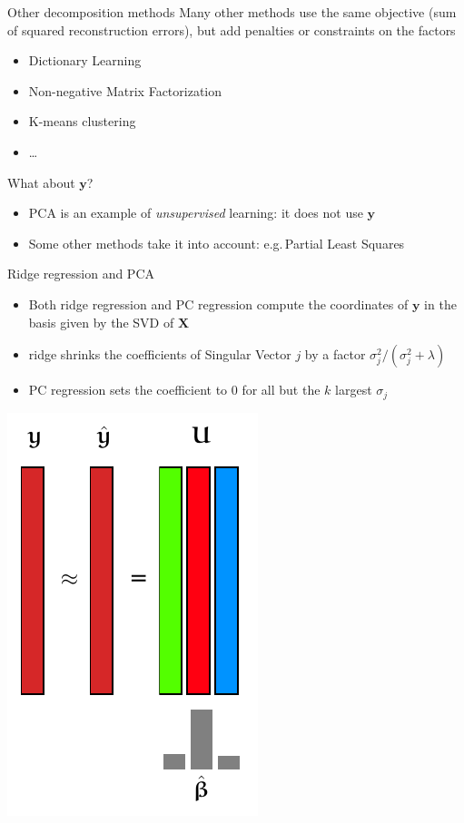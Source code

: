 \documentclass[presentation,mathserif,table]{beamer}
\newcommand{\eg}{e.g.\,}
\newcommand{\X}{{\mathbold X}}
\newcommand{\y}{{\mathbold y}}
\begin{document}
\begin{frame}[label={sec:orge968557}]{Other decomposition methods}
Many other methods use the same objective (sum of squared reconstruction errors), but add penalties or constraints on the factors
\begin{itemize}
\item Dictionary Learning
\item Non-negative Matrix Factorization
\item K-means clustering
\item \ldots{}
\end{itemize}

\begin{block}{What about \(\y\)?}
\begin{itemize}
\item PCA is an example of \emph{unsupervised} learning: it does not use \(\y\)
\item Some other methods take it into account: \eg Partial Least Squares
\end{itemize}
\end{block}
\end{frame}
\begin{frame}[label={sec:org6ee4f75}]{Ridge regression and PCA}
\begin{itemize}
\item Both ridge regression and PC regression compute the coordinates of \(\y\) in the basis given by the SVD of \(\X\)
\item ridge shrinks the coefficients of Singular Vector \(j\) by a factor \(\sigma_j^2 / (\sigma_j^2 + \lambda)\)
\item PC regression sets the coefficient to 0 for all but the \(k\) largest \(\sigma_j\)
\end{itemize}

\begin{center}
\includegraphics[height=.6\textheight]{figures/generated/dim_reduction_colors/regression_reduced_3_svd.pdf}
\end{center}
\end{frame}
\end{document}
